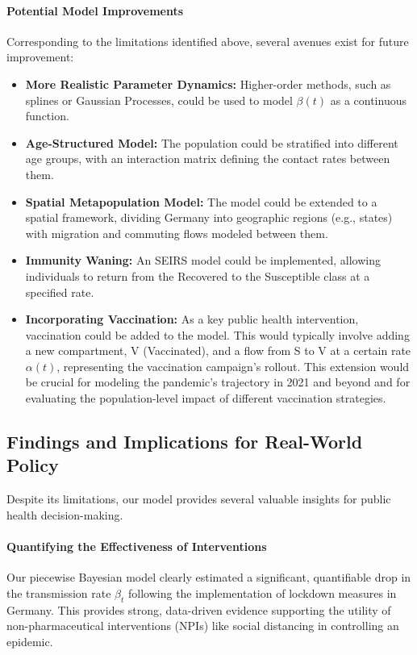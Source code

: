 \documentclass[12pt, a4paper]{article}
\begin{document}
\paragraph{Potential Model Improvements} Corresponding to the limitations identified above, several avenues exist for future improvement:
\begin{itemize}
    \item \textbf{More Realistic Parameter Dynamics:} Higher-order methods, such as splines or Gaussian Processes, could be used to model $\beta(t)$ as a continuous function.
    \item \textbf{Age-Structured Model:} The population could be stratified into different age groups, with an interaction matrix defining the contact rates between them.
    \item \textbf{Spatial Metapopulation Model:} The model could be extended to a spatial framework, dividing Germany into geographic regions (e.g., states) with migration and commuting flows modeled between them.
    \item \textbf{Immunity Waning:} An SEIRS model could be implemented, allowing individuals to return from the Recovered to the Susceptible class at a specified rate.
    \item \textbf{Incorporating Vaccination:} As a key public health intervention, vaccination could be added to the model. This would typically involve adding a new compartment, V (Vaccinated), and a flow from S to V at a certain rate $\alpha(t)$, representing the vaccination campaign's rollout. This extension would be crucial for modeling the pandemic's trajectory in 2021 and beyond and for evaluating the population-level impact of different vaccination strategies.
\end{itemize}

\subsection{Findings and Implications for Real-World Policy}
Despite its limitations, our model provides several valuable insights for public health decision-making.

\paragraph{Quantifying the Effectiveness of Interventions} Our piecewise Bayesian model clearly estimated a significant, quantifiable drop in the transmission rate $\beta_t$ following the implementation of lockdown measures in Germany. This provides strong, data-driven evidence supporting the utility of non-pharmaceutical interventions (NPIs) like social distancing in controlling an epidemic.
\end{document}
